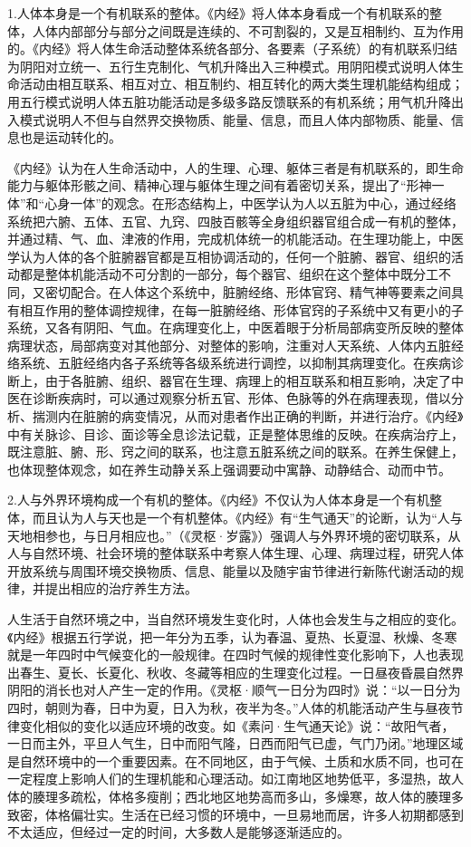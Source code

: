 \documentclass[draft,12pt]{ctexbook}
\begin{document}
1.人体本身是一个有机联系的整体。《内经》将人体本身看成一个有机联系的整体，人体内部部分与部分之间既是连续的、不可割裂的，又是互相制约、互为作用的。《内经》将人体生命活动整体系统各部分、各要素（子系统）的有机联系归结为阴阳对立统一、五行生克制化、气机升降出入三种模式。用阴阳模式说明人体生命活动由相互联系、相互对立、相互制约、相互转化的两大类生理机能结构组成；用五行模式说明人体五脏功能活动是多级多路反馈联系的有机系统；用气机升降出入模式说明人不但与自然界交换物质、能量、信息，而且人体内部物质、能量、信息也是运动转化的。

《内经》认为在人生命活动中，人的生理、心理、躯体三者是有机联系的，即生命能力与躯体形骸之间、精神心理与躯体生理之间有着密切关系，提出了“形神一体”和“心身一体”的观念。在形态结构上，中医学认为人以五脏为中心，通过经络系统把六腑、五体、五官、九窍、四肢百骸等全身组织器官组合成一有机的整体，并通过精、气、血、津液的作用，完成机体统一的机能活动。在生理功能上，中医学认为人体的各个脏腑器官都是互相协调活动的，任何一个脏腑、器官、组织的活动都是整体机能活动不可分割的一部分，每个器官、组织在这个整体中既分工不同，又密切配合。在人体这个系统中，脏腑经络、形体官窍、精气神等要素之间具有相互作用的整体调控规律，在每一脏腑经络、形体官窍的子系统中又有更小的子系统，又各有阴阳、气血。在病理变化上，中医着眼于分析局部病变所反映的整体病理状态，局部病变对其他部分、对整体的影响，注重对人天系统、人体内五脏经络系统、五脏经络内各子系统等各级系统进行调控，以抑制其病理变化。在疾病诊断上，由于各脏腑、组织、器官在生理、病理上的相互联系和相互影响，决定了中医在诊断疾病时，可以通过观察分析五官、形体、色脉等的外在病理表现，借以分析、揣测内在脏腑的病变情况，从而对患者作出正确的判断，并进行治疗。《内经》中有关脉诊、目诊、面诊等全息诊法记载，正是整体思维的反映。在疾病治疗上，既注意脏、腑、形、窍之间的联系，也注意五脏系统之间的联系。在养生保健上，也体现整体观念，如在养生动静关系上强调要动中寓静、动静结合、动而中节。

2.人与外界环境构成一个有机的整体。《内经》不仅认为人体本身是一个有机整体，而且认为人与天也是一个有机整体。《内经》有“生气通天”的论断，认为“人与天地相参也，与日月相应也。”（《灵枢·岁露》）强调人与外界环境的密切联系，从人与自然环境、社会环境的整体联系中考察人体生理、心理、病理过程，研究人体开放系统与周围环境交换物质、信息、能量以及随宇宙节律进行新陈代谢活动的规律，并提出相应的治疗养生方法。

人生活于自然环境之中，当自然环境发生变化时，人体也会发生与之相应的变化。《内经》根据五行学说，把一年分为五季，认为春温、夏热、长夏湿、秋燥、冬寒就是一年四时中气候变化的一般规律。在四时气候的规律性变化影响下，人也表现出春生、夏长、长夏化、秋收、冬藏等相应的生理变化过程。一日昼夜昏晨自然界阴阳的消长也对人产生一定的作用。《灵枢·顺气一日分为四时》说：“以一日分为四时，朝则为春，日中为夏，日入为秋，夜半为冬。”人体的机能活动产生与昼夜节律变化相似的变化以适应环境的改变。如《素问·生气通天论》说：“故阳气者，一日而主外，平旦人气生，日中而阳气隆，日西而阳气已虚，气门乃闭。”地理区域是自然环境中的一个重要因素。在不同地区，由于气候、土质和水质不同，也可在一定程度上影响人们的生理机能和心理活动。如江南地区地势低平，多湿热，故人体的腠理多疏松，体格多瘦削；西北地区地势高而多山，多燥寒，故人体的腠理多致密，体格偏壮实。生活在已经习惯的环境中，一旦易地而居，许多人初期都感到不太适应，但经过一定的时间，大多数人是能够逐渐适应的。
\end{document}
